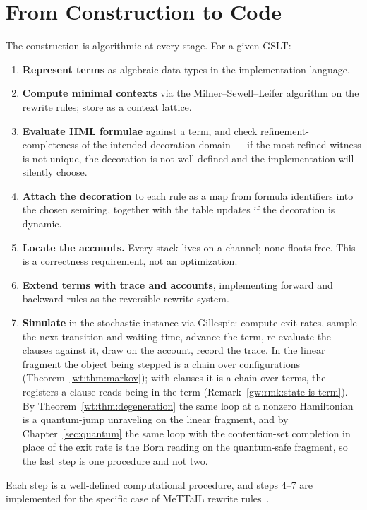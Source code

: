 \section{From Construction to Code}

The construction is algorithmic at every stage.  For a given GSLT:

\begin{enumerate}[itemsep=4pt]
  \item \textbf{Represent terms} as algebraic data types in the
        implementation language.

  \item \textbf{Compute minimal contexts} via the Milner--Sewell--Leifer
        algorithm on the rewrite rules; store as a context lattice.

  \item \textbf{Evaluate HML formulae} against a term, and check
        refinement-completeness of the intended decoration domain --- if
        the most refined witness is not unique, the decoration is not
        well defined and the implementation will silently choose.

  \item \textbf{Attach the decoration} to each rule as a map from formula
        identifiers into the chosen semiring, together with the table
        updates if the decoration is dynamic.

  \item \textbf{Locate the accounts.}  Every stack lives on a channel;
        none floats free.  This is a correctness requirement, not an
        optimization.

  \item \textbf{Extend terms with trace and accounts}, implementing
        forward and backward rules as the reversible rewrite system.

  \item \textbf{Simulate} in the stochastic instance via Gillespie:
        compute exit rates, sample the next transition and waiting time,
        advance the term, re-evaluate the clauses against it, draw on
        the account, record the trace.  In the linear fragment the object
        being stepped is a chain over configurations
        (Theorem~\ref{wt:thm:markov}); with clauses it is a chain over
        terms, the registers a clause reads being in the term
        (Remark~\ref{gw:rmk:state-is-term}).  By
        Theorem~\ref{wt:thm:degeneration} the same loop at a nonzero
        Hamiltonian is a quantum-jump unraveling on the linear fragment,
        and by Chapter~\ref{sec:quantum} the same loop with the
        contention-set completion in place of the exit rate is the Born
        reading on the quantum-safe fragment, so the last step is one
        procedure and not two.
\end{enumerate}

Each step is a well-defined computational procedure, and steps 4--7 are
implemented for the specific case of MeTTaIL rewrite
rules~\cite{StochSim}.


